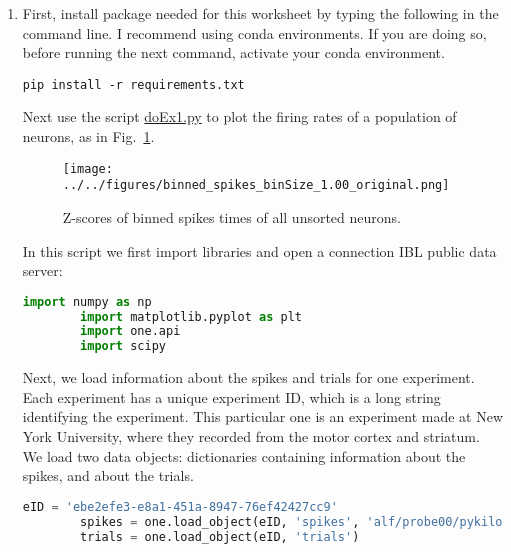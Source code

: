 \documentclass[12pt]{article}
\begin{document}
\begin{enumerate}

    \item First, install package needed for this worksheet by typing the
        following in the command line. I recommend using conda environments. If
        you are doing so, before running the next command, activate your conda
        environment.

        \begin{lstlisting}[backgroundcolor=\color{lightgray}]
        pip install -r requirements.txt
        \end{lstlisting}

        Next use the script
        \href{https://github.com/joacorapela/statNeuro2025/blob/master/worksheets/04_dimensionalityReduction/doEx1.py}{doEx1.py}
        to plot the firing rates of a population of neurons, as in
        Fig.~\ref{fig:ex1}.

        \begin{figure}
            \begin{center}
                \texttt{[image: ../../figures/binned\_spikes\_binSize\_1.00\_original.png]}
                \caption{Z-scores of binned spikes times of all unsorted
                neurons.}
            \end{center}
            \label{fig:ex1}
        \end{figure}

        In this script we first import libraries and open a connection IBL public data
        server:

        \begin{lstlisting}[backgroundcolor=\color{lightgray},language=Python]
        import numpy as np
        import matplotlib.pyplot as plt
        import one.api
        import scipy
        \end{lstlisting}

        Next, we load information about the spikes and trials for one
        experiment. Each experiment has a unique experiment ID, which is a long
        string identifying the experiment. This particular one is an experiment
        made at New York University, where they recorded from the motor cortex
        and striatum.  We load two data objects: dictionaries containing
        information about the spikes, and about the trials.

        \begin{lstlisting}[backgroundcolor=\color{lightgray},language=Python]
        eID = 'ebe2efe3-e8a1-451a-8947-76ef42427cc9'
        spikes = one.load_object(eID, 'spikes', 'alf/probe00/pykilosort')
        trials = one.load_object(eID, 'trials')
        \end{lstlisting}


\end{enumerate}
\end{document}
